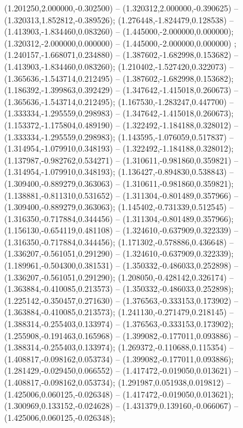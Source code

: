  (1.201250,2.000000,-0.302500) -- (1.320312,2.000000,-0.390625) -- (1.320313,1.852812,-0.389526);
 (1.276448,-1.824479,0.128538) -- (1.413903,-1.834460,0.083260) -- (1.445000,-2.000000,0.000000);
 (1.320312,-2.000000,0.000000) -- (1.445000,-2.000000,0.000000) ;
 (1.240157,-1.668071,0.234880) -- (1.387602,-1.682998,0.153682) -- (1.413903,-1.834460,0.083260);
 (1.210402,-1.527420,0.322073) -- (1.365636,-1.543714,0.212495) -- (1.387602,-1.682998,0.153682);
 (1.186392,-1.399863,0.392429) -- (1.347642,-1.415018,0.260673) -- (1.365636,-1.543714,0.212495);
 (1.167530,-1.283247,0.447700) -- (1.333334,-1.295559,0.298983) -- (1.347642,-1.415018,0.260673);
 (1.153372,-1.175804,0.489190) -- (1.322492,-1.184188,0.328012) -- (1.333334,-1.295559,0.298983);
 (1.143595,-1.076059,0.517837) -- (1.314954,-1.079910,0.348193) -- (1.322492,-1.184188,0.328012);
 (1.137987,-0.982762,0.534271) -- (1.310611,-0.981860,0.359821) -- (1.314954,-1.079910,0.348193);
 (1.136427,-0.894830,0.538843) -- (1.309400,-0.889279,0.363063) -- (1.310611,-0.981860,0.359821);
 (1.138881,-0.811310,0.531652) -- (1.311304,-0.801489,0.357966) -- (1.309400,-0.889279,0.363063);
 (1.145402,-0.731339,0.512545) -- (1.316350,-0.717884,0.344456) -- (1.311304,-0.801489,0.357966);
 (1.156130,-0.654119,0.481108) -- (1.324610,-0.637909,0.322339) -- (1.316350,-0.717884,0.344456);
 (1.171302,-0.578886,0.436648) -- (1.336207,-0.561051,0.291290) -- (1.324610,-0.637909,0.322339);
 (1.189961,-0.504300,0.381531) -- (1.350332,-0.486033,0.252898) -- (1.336207,-0.561051,0.291290);
 (1.208050,-0.428142,0.326174) -- (1.363884,-0.410085,0.213573) -- (1.350332,-0.486033,0.252898);
 (1.225142,-0.350457,0.271630) -- (1.376563,-0.333153,0.173902) -- (1.363884,-0.410085,0.213573);
 (1.241130,-0.271479,0.218145) -- (1.388314,-0.255403,0.133974) -- (1.376563,-0.333153,0.173902);
 (1.255908,-0.191463,0.165968) -- (1.399082,-0.177011,0.093886) -- (1.388314,-0.255403,0.133974);
 (1.269372,-0.110688,0.115354) -- (1.408817,-0.098162,0.053734) -- (1.399082,-0.177011,0.093886);
 (1.281429,-0.029450,0.066552) -- (1.417472,-0.019050,0.013621) -- (1.408817,-0.098162,0.053734);
 (1.291987,0.051938,0.019812) -- (1.425006,0.060125,-0.026348) -- (1.417472,-0.019050,0.013621);
 (1.300969,0.133152,-0.024628) -- (1.431379,0.139160,-0.066067) -- (1.425006,0.060125,-0.026348);
